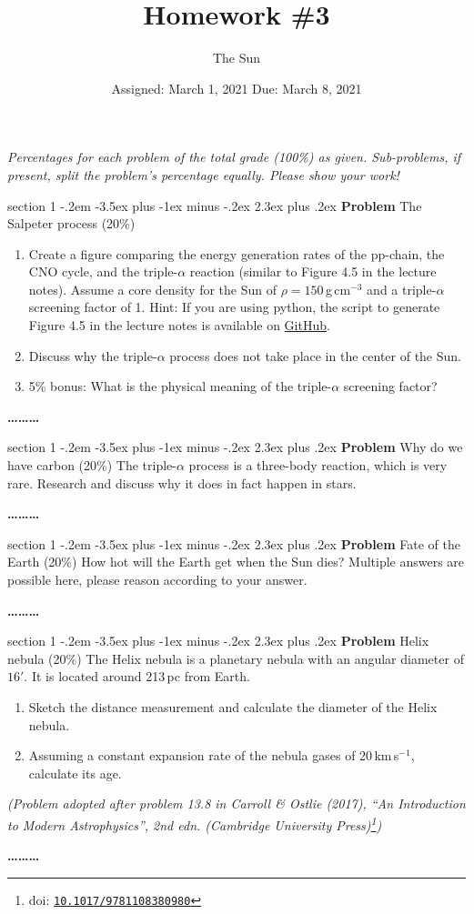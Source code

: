 \documentclass[letterpaper,12pt,twoside=false,DIV=11]{scrartcl}
\makeatletter
\newcommand{\topic}{\author}
\newenvironment{problem}{\@startsection
    {section}
    {1}
    {-.2em}
    {-3.5ex plus -1ex minus -.2ex}
    {2.3ex plus .2ex}
    {
        \pagebreak[3] %
        \noindent\sffamily\bfseries Problem
    }
}
{
    \begin{center}\large\bfseries\ldots\ldots\ldots\end{center}
}
\makeatother
\begin{document}
\title{Homework \#3}
\topic{The Sun}
\date{Assigned: March 1, 2021 \qquad Due: March 8, 2021}

\maketitle
\thispagestyle{fancy}

\noindent\emph{Percentages for each problem of the total grade (100\%) as given. Sub-problems, if present, split the problem's percentage equally. Please show your work!}

\begin{problem}{The Salpeter process (20\%)}
\begin{enumerate}
    \item Create a figure comparing the energy generation rates of the pp-chain, the CNO cycle, and the triple-$\alpha$ reaction (similar to Figure 4.5 in the lecture notes). Assume a core density for the Sun of $\rho = 150$\,g\,cm$^{-3}$ and a triple-$\alpha$ screening factor of 1. Hint: If you are using python, the script to generate Figure 4.5 in the lecture notes is available on \href{https://github.com/galactic-forensics/lecture_origin_elements/blob/main/figures/sun/energy_h_burning.py}{GitHub}.
    \item Discuss why the triple-$\alpha$ process does not take place in the center of the Sun.
    \item 5\% bonus: What is the physical meaning of the triple-$\alpha$ screening factor? 
\end{enumerate}
\end{problem}

\begin{problem}{Why do we have carbon (20\%)}
The triple-$\alpha$ process is a three-body reaction, which is very rare. Research and discuss why it does in fact happen in stars.
\end{problem}

\begin{problem}{Fate of the Earth (20\%)}
How hot will the Earth get when the Sun dies? Multiple answers are possible here, please reason according to your answer.
\end{problem}

\begin{problem}{Helix nebula (20\%)}
The Helix nebula is a planetary nebula with an angular diameter of $16'$. It is located around 213\,pc from Earth.
\begin{enumerate}
    \item Sketch the distance measurement and calculate the diameter of the Helix nebula.
    \item Assuming a constant expansion rate of the nebula gases of 20\,km\,s$^{-1}$, calculate its age.
\end{enumerate}

\noindent\emph{(Problem adopted after problem 13.8 in Carroll \& Ostlie (2017), ``An Introduction to Modern Astrophysics'', 2nd edn. (Cambridge University Press)\footnote{doi: \href{http://doi.org/10.1017/9781108380980}{\texttt{10.1017/9781108380980}}})}
\end{problem}
\end{document}
